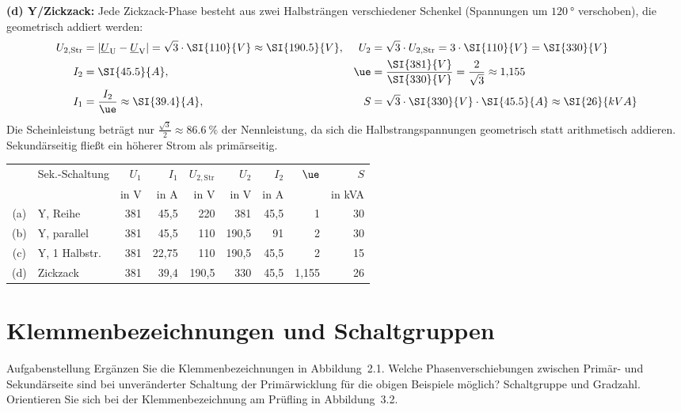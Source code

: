 \textbf{(d) Y/Zickzack:} Jede Zickzack-Phase besteht aus zwei Halbsträngen verschiedener Schenkel (Spannungen um $\SI{120}{\degree}$ verschoben), die geometrisch addiert werden:
\begin{align*}
  U_{2,\mathrm{Str}} &= |\underline{U}_\mathrm{U} - \underline{U}_\mathrm{V}| = \sqrt{3}\cdot\SI{110}{V} \approx \SI{190.5}{V}, &
  U_2 &= \sqrt{3}\cdot U_{2,\mathrm{Str}} = 3\cdot\SI{110}{V} = \SI{330}{V}\\
  I_2 &= \SI{45.5}{A}, &
  \ue &= \frac{\SI{381}{V}}{\SI{330}{V}} = \frac{2}{\sqrt{3}} \approx 1{,}155\\
  I_1 &= \frac{I_2}{\ue} \approx \SI{39.4}{A}, &
  S &= \sqrt{3}\cdot\SI{330}{V}\cdot\SI{45.5}{A} \approx \SI{26}{kVA}
\end{align*}
Die Scheinleistung beträgt nur $\frac{\sqrt{3}}{2} \approx \SI{86.6}{\percent}$ der Nennleistung, da sich die Halbstrangspannungen geometrisch statt arithmetisch addieren. Sekundärseitig fließt ein höherer Strom als primärseitig.

\begin{ergebnis}
\centering
\small
\setlength{\tabcolsep}{4pt}
\begin{tabular}{@{}cl*{7}{r}@{}}
\toprule
 & Sek.-Schaltung & $U_1$ & $I_1$ & $U_{2,\mathrm{Str}}$ & $U_2$ & $I_2$ & $\ue$ & $S$\\
 &  & in V & in A & in V & in V & in A & & in kVA\\
\midrule
(a) & Y, Reihe    & 381 & 45,5  & 220   & 381   & 45,5 & 1     & 30\\
(b) & Y, parallel & 381 & 45,5  & 110   & 190,5 & 91   & 2     & 30\\
(c) & Y, 1 Halbstr. & 381 & 22,75 & 110 & 190,5 & 45,5 & 2     & 15\\
(d) & Zickzack    & 381 & 39,4  & 190,5 & 330   & 45,5 & 1,155 & 26\\
\bottomrule
\end{tabular}
\end{ergebnis}

\section{Klemmenbezeichnungen und Schaltgruppen}\label{sec:a3}

\begin{aufgabe}{Aufgabenstellung}
Ergänzen Sie die Klemmenbezeichnungen in Abbildung~2.1. Welche Phasenverschiebungen zwischen Primär- und Sekundärseite sind bei unveränderter Schaltung der Primärwicklung für die obigen Beispiele möglich? Schaltgruppe und Gradzahl. Orientieren Sie sich bei der Klemmenbezeichnung am Prüfling in Abbildung~3.2.
\end{aufgabe}

